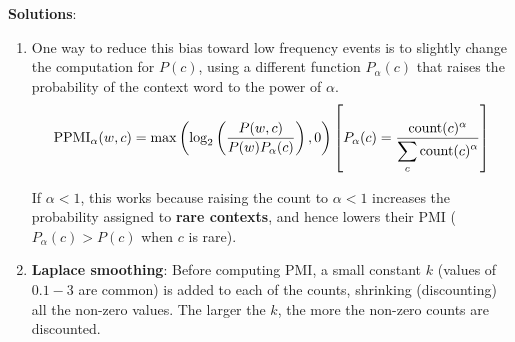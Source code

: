 \textbf{Solutions}:
\begin{enumerate}
    \item One way to reduce this bias toward low frequency events is to slightly change the computation for $P(c)$, using a different function $P_\alpha(c)$ that raises the probability of the context word to the power of $\alpha$.
    \[
        \displaystyle \rcmdXPPMI_\alpha(w, c) = \max\left(\log_2\left(\frac{P(w, c)}{P(w)P_\alpha(c)}\right),0\right) \hfill \left[ P_\alpha(c) = \frac{\rcmdXcount(c)^\alpha}{\displaystyle\sum_c \rcmdXcount(c)^\alpha} \right]
    \]
    
    If $\alpha < 1$, this works because raising the count to $\alpha < 1$ increases the probability assigned to \textbf{rare contexts}, and hence lowers their PMI ($P_\alpha(c) > P(c)$ when $c$ is rare).

    \item \textbf{Laplace smoothing}: Before computing PMI, a small constant $k$ (values of $0.1-3$ are common) is added to each of the counts, shrinking (discounting) all the non-zero values. The larger the $k$, the more the non-zero counts are discounted.
    
\end{enumerate}












































































